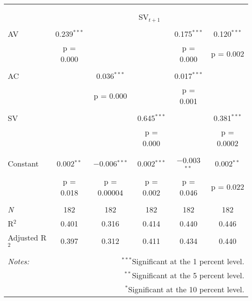 
\begin{tabular}{@{\extracolsep{5pt}}lccccc} 
\\[-1.8ex]\hline 
\hline \\[-1.8ex] 
\\[-1.8ex] & \multicolumn{5}{c}{SV$_{t+1}$} \\ 
\hline \\[-1.8ex] 
 AV & 0.239$^{***}$ &  &  & 0.175$^{***}$ & 0.120$^{***}$ \\ 
  & p = 0.000 &  &  & p = 0.000 & p = 0.002 \\ 
  & & & & & \\ 
 AC &  & 0.036$^{***}$ &  & 0.017$^{***}$ &  \\ 
  &  & p = 0.000 &  & p = 0.001 &  \\ 
  & & & & & \\ 
 SV &  &  & 0.645$^{***}$ &  & 0.381$^{***}$ \\ 
  &  &  & p = 0.000 &  & p = 0.0002 \\ 
  & & & & & \\ 
 Constant & 0.002$^{**}$ & $-$0.006$^{***}$ & 0.002$^{***}$ & $-$0.003$^{**}$ & 0.002$^{**}$ \\ 
  & p = 0.018 & p = 0.00004 & p = 0.002 & p = 0.046 & p = 0.022 \\ 
  & & & & & \\ 
\textit{N} & 182 & 182 & 182 & 182 & 182 \\ 
R$^{2}$ & 0.401 & 0.316 & 0.414 & 0.440 & 0.446 \\ 
Adjusted R$^{2}$ & 0.397 & 0.312 & 0.411 & 0.434 & 0.440 \\ 
\hline 
\hline \\[-1.8ex] 
\textit{Notes:} & \multicolumn{5}{r}{$^{***}$Significant at the 1 percent level.} \\ 
 & \multicolumn{5}{r}{$^{**}$Significant at the 5 percent level.} \\ 
 & \multicolumn{5}{r}{$^{*}$Significant at the 10 percent level.} \\ 
\end{tabular} 
